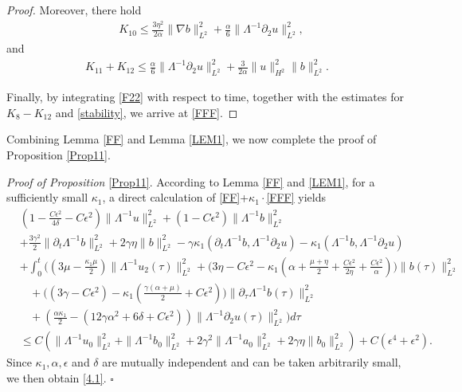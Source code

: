 \documentclass[reqno,11pt]{amsart}
\numberwithin{Thm}{section}
\begin{document}
\begin{proof}
Moreover, there hold
\begin{align*}
&K_{10}
\leq\frac{3\eta^2}{2\alpha}\|\nabla b\|_{L^{2}}^2+\frac{\alpha}{6}\|\Lambda^{-1}\partial_2 u\|_{L^{2}}^2,
\end{align*}
and
\begin{align*}
K_{11}+K_{12}
\leq \frac{\alpha}{6}\|\Lambda^{-1}\partial_2 u\|_{L^{2}}^2+\frac{3}{2\alpha}\|u\|_{H^{2}}^2\| b\|_{L^{2}}^2.
\end{align*}

Finally, by integrating \eqref{F22} with respect to time, together with the estimates for $K_8-K_{12}$ and \eqref{stability}, we arrive at \eqref{FFF}.
\end{proof}


 Combining Lemma \ref{FF} and Lemma \ref{LEM1}, we now complete the proof of  Proposition \ref{Prop11}.

 \textit{Proof of Proposition} \ref{Prop11}. According to Lemma \ref{FF} and \ref{LEM1}, for a sufficiently small $\kappa_1$, a direct calculation of \eqref{FF}+$\kappa_1\cdot$\eqref{FFF} yields
 \begin{align*}
&(1-\frac{C\epsilon^2}{4\delta}-C\epsilon^2)\|\Lambda^{-1} u\|^2_{L^2}+(1-C\epsilon^2)\|\Lambda^{-1} b\|^2_{L^2}\nonumber\\
&+\frac{3\gamma^2}{2}\|\partial_t\Lambda^{-1}b\|^2_{L^2}
+2\gamma\eta\|b\|^2_{L^2}-\gamma\kappa_1(\partial_{t}\Lambda^{-1}b,\Lambda^{-1}\partial_2u)-\kappa_1(\Lambda^{-1}b,\Lambda^{-1}\partial_2u)\nonumber\\
&+\int_0^t\Big((3\mu-\frac{\kappa_1\mu}{2})\|\Lambda^{-1}u_2(\tau)\|^2_{L^2}
+\big(3\eta-C\epsilon^2-\kappa_1(\alpha+\frac{\mu+\eta}{2}+\frac{C\epsilon^2}{2\eta}+\frac{C\epsilon^2}{\alpha})\big)\|b(\tau)\|^2_{L^2}\nonumber\\
&\ \ \ \
+\big((3\gamma-C\epsilon^2)-\kappa_1(\frac{\gamma(\alpha+\mu)}{2}+C\epsilon^2)\big)\|\partial_{\tau}\Lambda^{-1}b(\tau)\|^2_{L^2}
\nonumber\\
&\ \ \ \ +(\frac{\alpha\kappa_1}{2}-(12\gamma\alpha^2+6\delta+C\epsilon^2))\|\Lambda^{-1}\partial_2u(\tau)\|_{L^2}^2\Big)d\tau\nonumber\\
&\leq
C\left(\|\Lambda^{-1} u_0\|^2_{L^2}+\|\Lambda^{-1} b_0\|^2_{L^2}+2\gamma^2\|\Lambda^{-1}a_0\|^2_{L^2}
+2\gamma\eta\|b_0\|^2_{L^2}\right)+C(\epsilon^4+\epsilon^2).
\end{align*}
Since $\kappa_1,\alpha,\epsilon$ and $\delta$ are mutually independent and can be taken arbitrarily small, we then obtain \eqref{4.1}.
\hfill$\square$
\end{document}
